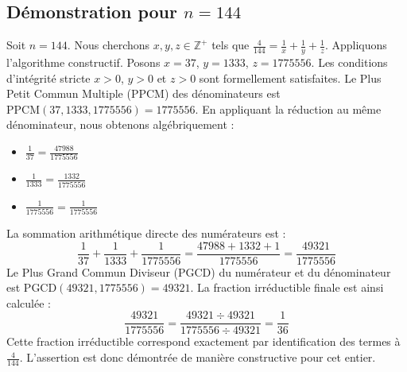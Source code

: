 \documentclass[11pt,a4paper]{article}
\begin{document}
\subsection{Démonstration pour $n = 144$}
Soit $n = 144$. Nous cherchons $x, y, z \in \mathbb{Z}^{+}$ tels que $\frac{4}{144} = \frac{1}{x} + \frac{1}{y} + \frac{1}{z}$.
Appliquons l'algorithme constructif. Posons $x = 37$, $y = 1333$, $z = 1775556$.
Les conditions d'intégrité stricte $x > 0$, $y > 0$ et $z > 0$ sont formellement satisfaites.
Le Plus Petit Commun Multiple (PPCM) des dénominateurs est $\text{PPCM}(37, 1333, 1775556) = 1775556$.
En appliquant la réduction au même dénominateur, nous obtenons algébriquement :
\begin{itemize}
    \item $\frac{1}{37} = \frac{47988}{1775556}$
    \item $\frac{1}{1333} = \frac{1332}{1775556}$
    \item $\frac{1}{1775556} = \frac{1}{1775556}$
\end{itemize}
La sommation arithmétique directe des numérateurs est :
$$ \frac{1}{37} + \frac{1}{1333} + \frac{1}{1775556} = \frac{47988 + 1332 + 1}{1775556} = \frac{49321}{1775556} $$
Le Plus Grand Commun Diviseur (PGCD) du numérateur et du dénominateur est $\text{PGCD}(49321, 1775556) = 49321$.
La fraction irréductible finale est ainsi calculée :
$$ \frac{49321}{1775556} = \frac{49321 \div 49321}{1775556 \div 49321} = \frac{1}{36} $$
Cette fraction irréductible correspond exactement par identification des termes à $\frac{4}{144}$. L'assertion est donc démontrée de manière constructive pour cet entier.
\end{document}
